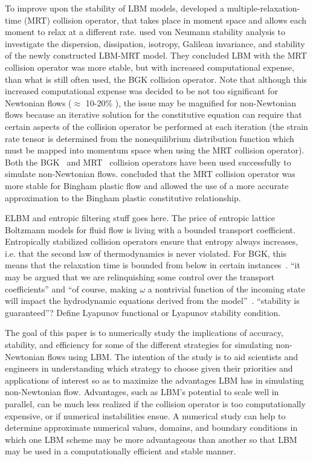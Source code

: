 \documentclass{article}
\begin{document}
To improve upon the stability of LBM models, \citet{d1994generalized} developed a multiple-relaxation-time (MRT) collision operator, that takes place in moment space and allows each moment to relax at a different rate.
\citet{lallemand2000theory} used von Neumann stability analysis to investigate the dispersion, dissipation, isotropy, Galilean invariance, and stability of the newly constructed LBM-MRT model.
They concluded LBM with the MRT collision operator was more stable, but with increased computational expense, than what is still often used, the BGK collision operator.
Note that although this increased computational expense was decided to be not too significant for Newtonian flows ($\approx$ 10-20\% \cite{lallemand2000theory}), the issue may be magnified for non-Newtonian flows because an iterative solution for the constitutive equation can require that certain aspects of the collision operator be performed at each iteration (the strain rate tensor is determined from the nonequilibrium distribution function which must be mapped into momentum space when using the MRT collision operator).
Both the BGK~\cite{wang2011lattice,ashrafizaadeh2009comparison,wang2015localized,tang2011bingham} and MRT~\cite{chen2014simulations,fallah2012multiple,chai2011multiple} collision operators have been used successfully to simulate non-Newtonian flows.
\citeauthor{chen2014simulations} concluded that the MRT collision operator was more stable for Bingham plastic flow and allowed the use of a more accurate approximation to the Bingham plastic constitutive relationship.

{\color{red} 
ELBM and entropic filtering stuff goes here.
The price of entropic lattice Boltzmann models for fluid flow is living with a bounded transport coefficient.
Entropically stabilized collision operators ensure that entropy always increases, i.e. that the second law of thermodynamics is never violated.
For BGK, this means that the relaxation time is bounded from below in certain instances~\cite{boghosian2001entropic}.
``it may be argued that we are relinquishing some control over the transport coefficients'' and ``of course, making $\omega$ a nontrivial function of the incoming state will impact the hydrodynamic equations derived from the model''~\cite{boghosian2001entropic}.
``stability is guaranteed''?
Define Lyapunov functional or Lyapunov stability condition.
}

The goal of this paper is to numerically study the implications of accuracy, stability, and efficiency for some of the different strategies for simulating non-Newtonian flows using LBM. The intention of the study is to aid scientists and engineers in understanding which strategy to choose given their priorities and applications of interest so as to maximize the advantages LBM has in simulating non-Newtonian flow.
Advantages, such as LBM's potential to scale well in parallel, can be much less realized if the collision operator is too computationally expensive, or if numerical instabilities ensue.
A numerical study can help to determine approximate numerical values, domains, and boundary conditions in which one LBM scheme may be more advantageous than another so that LBM may be used in a computationally efficient and stable manner.
\end{document}
